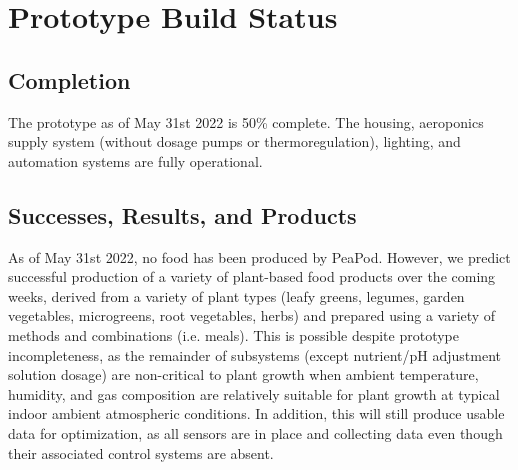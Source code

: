 \documentclass{../tex/report}
\begin{document}


\clearpage



\clearpage



\clearpage



\clearpage



\clearpage



\clearpage



\clearpage


% 

\section{Prototype Build Status}

\subsection{Completion}
The prototype as of May 31st 2022 is 50\% complete. The housing, aeroponics supply system (without dosage pumps or thermoregulation), lighting, and automation systems are fully operational.


\subsection{Successes, Results, and Products}

As of May 31st 2022, no food has been produced by PeaPod. However, we predict successful production of a variety of plant-based food products over the coming weeks, derived from a variety of plant types (leafy greens, legumes, garden vegetables, microgreens, root vegetables, herbs) and prepared using a variety of methods and combinations (i.e. meals). This is possible despite prototype incompleteness, as the remainder of subsystems (except nutrient/pH adjustment solution dosage) are non-critical to plant growth when ambient temperature, humidity, and gas composition are relatively suitable for plant growth at typical indoor ambient atmospheric conditions. In addition, this will still produce usable data for optimization, as all sensors are in place and collecting data even though their associated control systems are absent.
\end{document}

